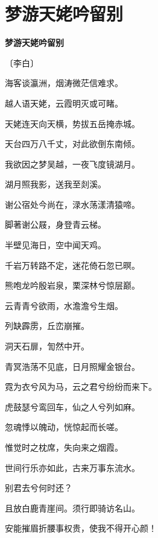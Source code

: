 \documentclass[12pt,UTF-8,openany,fontset=none]{ctexbook}
\begin{document}
\vspace{8pt}
\clearpage

\section{梦游天姥吟留别}


\begin{center}
    {\bfseries 梦游天姥吟留别}

    \vspace{18pt}

    \begin{large}\xuwen
        〔李白〕
    \end{large}

\end{center}

    \vspace{18pt}  %

\begin{center}
    \begin{Large}

        \hspace{34pt}海客谈瀛洲，烟涛微茫信难求。

        \hspace{34pt}越人语天姥，云霞明灭或可睹。

        天姥连天向天横，势拔五岳掩赤城。

        天台四万八千丈，对此欲倒东南倾。

        我欲因之梦吴越，一夜飞度镜湖月。

        湖月照我影，送我至剡溪。

        谢公宿处今尚在，渌水荡漾清猿啼。

        脚著谢公屐，身登青云梯。

        半壁见海日，空中闻天鸡。

        千岩万转路不定，迷花倚石忽已暝。

        熊咆龙吟殷岩泉，栗深林兮惊层巅。

        云青青兮欲雨，水澹澹兮生烟。

        列缺霹雳，丘峦崩摧。

        洞天石扉，訇然中开。

        青冥浩荡不见底，日月照耀金银台。

        \hspace{34pt}霓为衣兮风为马，云之君兮纷纷而来下。

        虎鼓瑟兮鸾回车，仙之人兮列如麻。

        忽魂悸以魄动，恍惊起而长嗟。

        惟觉时之枕席，失向来之烟霞。

        世间行乐亦如此，古来万事东流水。

        别君去兮何时还？

        且放白鹿青崖间。须行即骑访名山。

        安能摧眉折腰事权贵，使我不得开心颜！\hspace{24pt}

    \end{Large}

\end{center}
\end{document}
